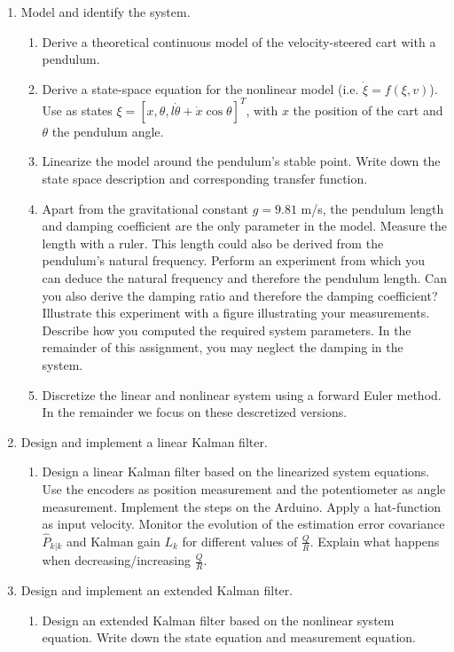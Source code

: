 \documentclass[10pt,a4paper]{article}
\begin{document}
\begin{enumerate}
  \item Model and identify the system.
  \begin{enumerate}
    \item Derive a theoretical continuous model of the velocity-steered cart with a pendulum.
    \item Derive a state-space equation for the nonlinear model (i.e. $\dot{\xi}=f(\xi, v)$). Use as states $\xi=[x, \theta, l\dot{\theta}+\dot{x}\cos\theta]^T$, with $x$ the position of the cart and $\theta$ the pendulum angle.
    \item Linearize the model around the pendulum's stable point. Write down the state space description and corresponding transfer function.
    \item Apart from the gravitational constant $g=9.81$ m/s, the pendulum length and damping coefficient are the only parameter in the model. Measure the length with a ruler. This length could also be derived from the pendulum's natural frequency. Perform an experiment from which you can deduce the natural frequency and therefore the pendulum length. Can you also derive the damping ratio and therefore the damping coefficient? Illustrate this experiment with a figure illustrating your measurements. Describe how you computed the required system parameters. In the remainder of this assignment, you may neglect the damping in the system.
    \item Discretize the linear and nonlinear system using a forward Euler method. In the remainder we focus on these descretized versions.
  \end{enumerate}
    \item Design and implement a linear Kalman filter.
  \begin{enumerate}
    \item Design a linear Kalman filter based on the linearized system equations. Use the encoders as position measurement and the potentiometer as angle measurement. Implement the steps on the Arduino. Apply a hat-function as input velocity. Monitor the evolution of the estimation error covariance $\hat{P}_{k|k}$ and Kalman gain $L_k$ for different values of $\frac{Q}{R}$. Explain what happens when decreasing/increasing $\frac{Q}{R}$.
  \end{enumerate}
  \item Design and implement an extended Kalman filter.
    \begin{enumerate}
    \item Design an extended Kalman filter based on the nonlinear system equation. Write down the state equation and measurement equation.

\end{enumerate}
\end{enumerate}
\end{document}
